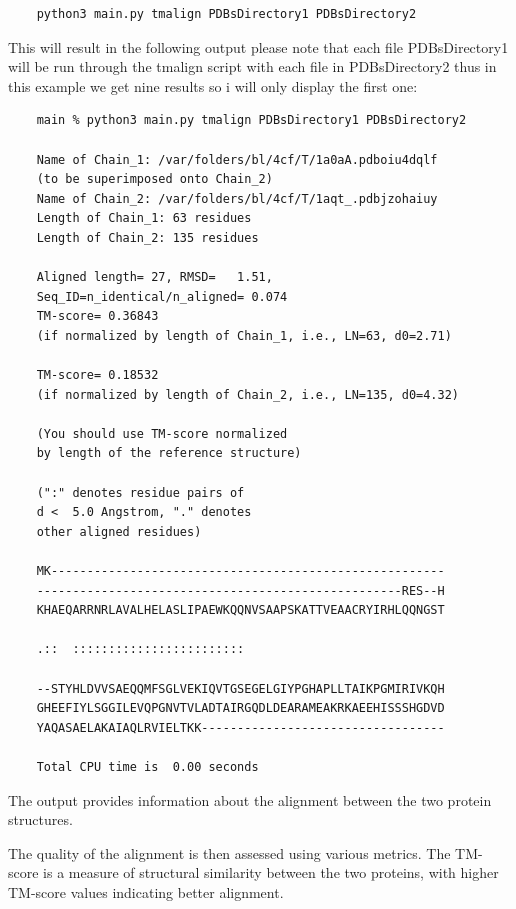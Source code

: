 \documentclass[]{final_report}
\begin{document}
\begin{lstlisting}
    python3 main.py tmalign PDBsDirectory1 PDBsDirectory2
\end{lstlisting}

This will result in the following output please note that each file PDBsDirectory1 will be run through the tmalign script with each file in PDBsDirectory2 thus in this example we get nine results so i will only display the first one:

\begin{lstlisting}
    main % python3 main.py tmalign PDBsDirectory1 PDBsDirectory2

    Name of Chain_1: /var/folders/bl/4cf/T/1a0aA.pdboiu4dqlf
    (to be superimposed onto Chain_2)
    Name of Chain_2: /var/folders/bl/4cf/T/1aqt_.pdbjzohaiuy
    Length of Chain_1: 63 residues
    Length of Chain_2: 135 residues

    Aligned length= 27, RMSD=   1.51, 
    Seq_ID=n_identical/n_aligned= 0.074
    TM-score= 0.36843 
    (if normalized by length of Chain_1, i.e., LN=63, d0=2.71)

    TM-score= 0.18532 
    (if normalized by length of Chain_2, i.e., LN=135, d0=4.32)

    (You should use TM-score normalized 
    by length of the reference structure)

    (":" denotes residue pairs of 
    d <  5.0 Angstrom, "." denotes 
    other aligned residues)

    MK-------------------------------------------------------
    ---------------------------------------------------RES--H
    KHAEQARRNRLAVALHELASLIPAEWKQQNVSAAPSKATTVEAACRYIRHLQQNGST
                                                            
    .::  ::::::::::::::::::::::::                                 

    --STYHLDVVSAEQQMFSGLVEKIQVTGSEGELGIYPGHAPLLTAIKPGMIRIVKQH
    GHEEFIYLSGGILEVQPGNVTVLADTAIRGQDLDEARAMEAKRKAEEHISSSHGDVD
    YAQASAELAKAIAQLRVIELTKK----------------------------------

    Total CPU time is  0.00 seconds
\end{lstlisting}

The output provides information about the alignment between the two protein structures.

The quality of the alignment is then assessed using various metrics. The TM-score is a measure of structural similarity between the two proteins, with higher TM-score values indicating better alignment.
\end{document}
